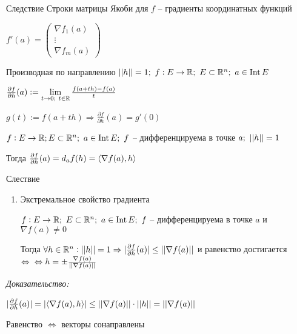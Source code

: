 \documentclass[12pt]{article}
\begin{document}
\begin{theo}{Следствие}
    Строки матрицы Якоби для $f$ -- градиенты координатных функций

    $f'(a) = \begin{pmatrix}
        \nabla f_1(a) \\
        \vdots \\
        \nabla f_m(a)
    \end{pmatrix}$
\end{theo}

\begin{defin}{Производная по направлению}
    $|| h || = 1;\ f : E \to \mathbb R;\ E \subset \mathbb R^n;\ a \in \operatorname{Int} E$

    $\frac{\partial f}{\partial h}(a) := \lim\limits_{t \to 0;\ t \in \mathbb R} \frac{f(a + th) - f(a)}{t}$
\end{defin}

\begin{Remark}{}
    $g(t) := f(a + th) \Rightarrow \frac{\partial f}{\partial h}(a) = g'(0)$
\end{Remark}

\begin{theo}{}
    $f : E \to \mathbb R; E \subset \mathbb R^n;\ a \in \operatorname{Int} E;\ f$ -- дифференцируема в точке $a;\ \parl{h} = 1$

    Тогда $\frac{\partial f}{\partial h}(a) = d_af(h) = \langle \nabla f(a), h \rangle$
\end{theo}

\begin{theo}{Слествие}
    \begin{enumerate}
        \item Экстремальное свойство градиента 
        
        $f : E \to \mathbb R;\ E \subset \mathbb R^n;\ a \in \operatorname{Int} E;\ f$ -- дифференцируема в точке $a$ и $\nabla f(a) \neq 0$

        Тогда $\forall h \in \mathbb R^n : || h || = 1 \Rightarrow |\frac{\partial f}{\partial h}(a)| \leq || \nabla f(a) ||$ и равенство достигается $\Leftrightarrow \\ \Leftrightarrow h = \pm \frac{\nabla f(a)}{|| \nabla f(a) ||}$
    \end{enumerate}
\end{theo}

\textit{Доказательство:}

$|\frac{\partial f}{\partial h}(a)| = |\langle \nabla f(a), h \rangle| \leq || \nabla f(a) || \cdot || h || = || \nabla f(a) ||$

Равенство $\Leftrightarrow$ векторы сонаправлены
\end{document}
